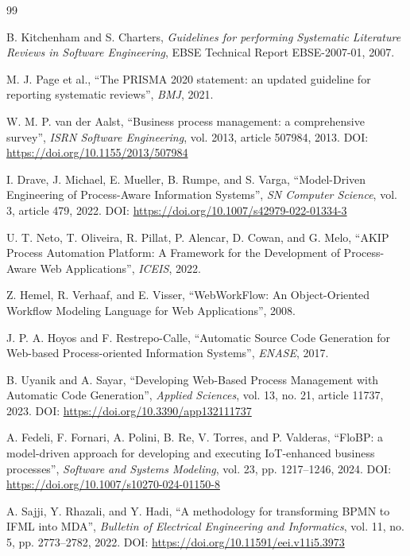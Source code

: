 \documentclass[12pt,a4paper]{article}
\begin{document}
\begin{thebibliography}{99}

B. Kitchenham and S. Charters, \textit{Guidelines for performing Systematic Literature Reviews in Software Engineering}, EBSE Technical Report EBSE-2007-01, 2007.

M. J. Page et al., ``The PRISMA 2020 statement: an updated guideline for reporting systematic reviews'', \textit{BMJ}, 2021.

W. M. P. van der Aalst, ``Business process management: a comprehensive survey'', \textit{ISRN Software Engineering}, vol. 2013, article 507984, 2013. DOI: \url{https://doi.org/10.1155/2013/507984}

I. Drave, J. Michael, E. Mueller, B. Rumpe, and S. Varga, ``Model-Driven Engineering of Process-Aware Information Systems'', \textit{SN Computer Science}, vol. 3, article 479, 2022. DOI: \url{https://doi.org/10.1007/s42979-022-01334-3}

U. T. Neto, T. Oliveira, R. Pillat, P. Alencar, D. Cowan, and G. Melo, ``AKIP Process Automation Platform: A Framework for the Development of Process-Aware Web Applications'', \textit{ICEIS}, 2022.

Z. Hemel, R. Verhaaf, and E. Visser, ``WebWorkFlow: An Object-Oriented Workflow Modeling Language for Web Applications'', 2008.

J. P. A. Hoyos and F. Restrepo-Calle, ``Automatic Source Code Generation for Web-based Process-oriented Information Systems'', \textit{ENASE}, 2017.

B. Uyanik and A. Sayar, ``Developing Web-Based Process Management with Automatic Code Generation'', \textit{Applied Sciences}, vol. 13, no. 21, article 11737, 2023. DOI: \url{https://doi.org/10.3390/app132111737}

A. Fedeli, F. Fornari, A. Polini, B. Re, V. Torres, and P. Valderas, ``FloBP: a model-driven approach for developing and executing IoT-enhanced business processes'', \textit{Software and Systems Modeling}, vol. 23, pp. 1217--1246, 2024. DOI: \url{https://doi.org/10.1007/s10270-024-01150-8}

A. Sajji, Y. Rhazali, and Y. Hadi, ``A methodology for transforming BPMN to IFML into MDA'', \textit{Bulletin of Electrical Engineering and Informatics}, vol. 11, no. 5, pp. 2773--2782, 2022. DOI: \url{https://doi.org/10.11591/eei.v11i5.3973}


\end{thebibliography}
\end{document}
